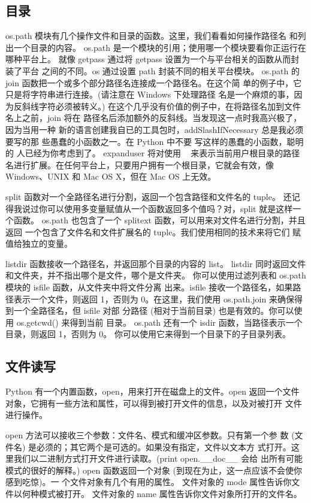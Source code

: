 \documentclass[twoside,11pt]{book}
\begin{document}
\subsection{目录}
os.path 模块有几个操作文件和目录的函数。这里，我们看看如何操作路径名 和列出一个目录的内容。
os.path 是一个模块的引用；使用哪一个模块要看你正运行在哪种平台上。 就像 getpass 通过将 getpass 设置为一个与平台相关的函数从而封装了平台 之间的不同。os 通过设置 path 封装不同的相关平台模块。
os.path 的 join 函数把一个或多个部分路径名连接成一个路径名。在这个简 单的例子中，它只是将字符串进行连接。(请注意在 Windows 下处理路径 名是一个麻烦的事，因为反斜线字符必须被转义。)
在这个几乎没有价值的例子中，在将路径名加到文件名上之前，join 将在 路径名后添加额外的反斜线。当发现这一点时我高兴极了，因为当用一种 新的语言创建我自已的工具包时，addSlashIfNecessary 总是我必须要写的那 些愚蠢的小函数之一。在 Python 中不要 写这样的愚蠢的小函数，聪明的 人已经为你考虑到了。
expanduser 将对使用 ~ 来表示当前用户根目录的路径名进行扩展。在任何平台上，只要用户拥有一个根目录，它就会有效，像 Windows、UNIX 和 Mac OS X，但在 Mac OS 上无效。

split 函数对一个全路径名进行分割，返回一个包含路径和文件名的 tuple。 还记得我说过你可以使用多变量赋值从一个函数返回多个值吗？对，split 就是这样一个函数。
os.path 也包含了一个 splitext 函数，可以用来对文件名进行分割，并且返回
一个包含了文件名和文件扩展名的 tuple。我们使用相同的技术来将它们
赋值给独立的变量。

listdir 函数接收一个路径名，并返回那个目录的内容的 list。
listdir 同时返回文件和文件夹，并不指出哪个是文件，哪个是文件夹。
你可以使用过滤列表和 os.path 模块的 isfile 函数，从文件夹中将文件分离 出来。isfile 接收一个路径名，如果路径表示一个文件，则返回 1，否则为 0。在这里，我们使用 os.path.join 来确保得到一个全路径名，但 isfile 对部 分路径 (相对于当前目录) 也是有效的。你可以使用 os.getcwd() 来得到当前 目录。
os.path 还有一个 isdir 函数，当路径表示一个目录，则返回 1，否则为 0。 你可以使用它来得到一个目录下的子目录列表。

\subsection{文件读写}
Python 有一个内置函数，open，用来打开在磁盘上的文件。open 返回一个文件 对象，它拥有一些方法和属性，可以得到被打开文件的信息，以及对被打开 文件进行操作。

open 方法可以接收三个参数：文件名、模式和缓冲区参数。只有第一个参 数 (文件名) 是必须的；其它两个是可选的。如果没有指定，文件以文本方 式打开。这里我们以二进制方式打开文件进行读取。(print open.\_\_doc\_\_ 会给 出所有可能模式的很好的解释。)
open 函数返回一个对象 (到现在为止，这一点应该不会使你感到吃惊)。一 个文件对象有几个有用的属性。
文件对象的 mode 属性告诉你文件以何种模式被打开。
文件对象的 name 属性告诉你文件对象所打开的文件名。
\end{document}
